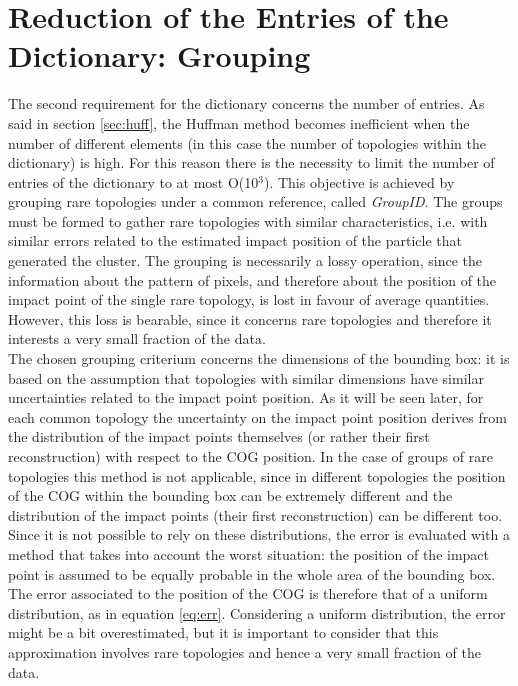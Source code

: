 \section{Reduction of the Entries of the Dictionary: Grouping}
\label{sec:group}
The second requirement for the dictionary concerns the number of entries. As said in section \ref{sec:huff}, the Huffman method becomes inefficient when the number of different elements (in this case the number of topologies within the dictionary) is high. For this reason there is the necessity to limit the number of entries of the dictionary to at most O(10$^3$). This objective is achieved by grouping rare topologies under a common reference, called \textit{GroupID}. The groups must be formed to gather rare topologies with similar characteristics, i.e. with similar errors related to the estimated impact position of the particle that generated the cluster. The grouping is necessarily a lossy operation, since the information about the pattern of pixels, and therefore about the position of the impact point of the single rare topology, is lost in favour of average quantities. However, this loss is bearable, since it concerns rare topologies and therefore it interests a very small fraction of the data.\\
The chosen grouping criterium concerns the dimensions of the bounding box: it is based on the assumption that topologies with similar dimensions have similar uncertainties related to the impact point position. As it will be seen later, for each common topology the uncertainty on the impact point position derives from the distribution of the impact points themselves (or rather their first reconstruction) with respect to the COG position. In the case of groups of rare topologies this method is not applicable, since in different topologies the position of the COG within the bounding box can be extremely different and the distribution of the impact points (their first reconstruction) can be different too. Since it is not possible to rely on these distributions, the error is evaluated with a method that takes into account the worst situation: the position of the impact point is assumed to be equally probable in the whole area of the bounding box. The error associated to the position of the COG is therefore that of a uniform distribution, as in equation \ref{eq:err}.
Considering a uniform distribution, the error might be a bit overestimated, but it is important to consider that this approximation involves rare topologies and hence a very small fraction of the data.\\
